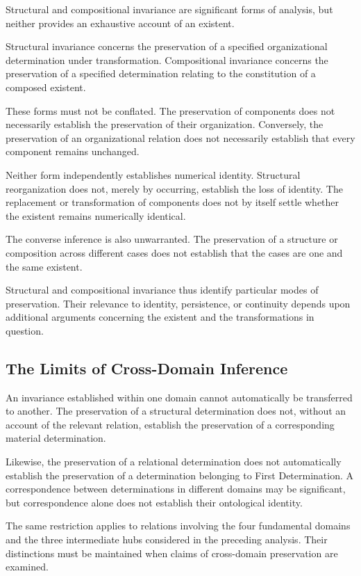 Structural and compositional invariance are significant
forms of analysis, but neither provides an exhaustive
account of an existent.

Structural invariance concerns the preservation of a
specified organizational determination under transformation.
Compositional invariance concerns the preservation of
a specified determination relating to the constitution
of a composed existent.

These forms must not be conflated. The preservation
of components does not necessarily establish the
preservation of their organization. Conversely, the
preservation of an organizational relation does not
necessarily establish that every component remains
unchanged.

Neither form independently establishes numerical
identity. Structural reorganization does not, merely
by occurring, establish the loss of identity. The
replacement or transformation of components does not
by itself settle whether the existent remains numerically
identical.

The converse inference is also unwarranted. The
preservation of a structure or composition across
different cases does not establish that the cases
are one and the same existent.

Structural and compositional invariance thus identify
particular modes of preservation. Their relevance
to identity, persistence, or continuity depends upon
additional arguments concerning the existent and
the transformations in question.

\subsection{The Limits of Cross-Domain Inference}

An invariance established within one domain cannot
automatically be transferred to another. The preservation
of a structural determination does not, without an
account of the relevant relation, establish the
preservation of a corresponding material determination.

Likewise, the preservation of a relational determination
does not automatically establish the preservation
of a determination belonging to First Determination.
A correspondence between determinations in different
domains may be significant, but correspondence alone
does not establish their ontological identity.

The same restriction applies to relations involving
the four fundamental domains and the three intermediate
hubs considered in the preceding analysis. Their
distinctions must be maintained when claims of
cross-domain preservation are examined.

